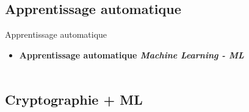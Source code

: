 \documentclass{beamer}
\begin{document}
  \subsection{Apprentissage automatique}
 
  \begin{frame}{Apprentissage automatique}

    \begin{itemize}
    \item<1-> {
      \textbf{Apprentissage automatique \textit{Machine Learning - ML}}\\
       \\
              }
  \end{itemize}
  \end{frame}

  \subsection{Cryptographie + ML}
\end{document}
